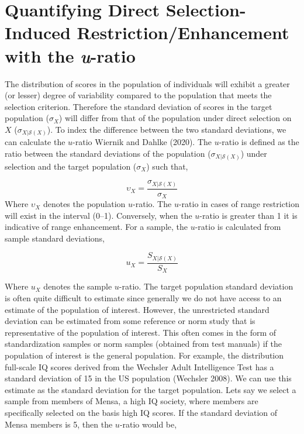 \documentclass[
  letterpaper,
  DIV=11,
  numbers=noendperiod]{scrreprt}
\begin{document}
\section{\texorpdfstring{Quantifying Direct Selection-Induced
Restriction/Enhancement with the
\emph{u}-ratio}{Quantifying Direct Selection-Induced Restriction/Enhancement with the u-ratio}}\label{quantifying-direct-selection-induced-restrictionenhancement-with-the-u-ratio}

The distribution of scores in the population of individuals will exhibit
a greater (or lesser) degree of variability compared to the population
that meets the selection criterion. Therefore the standard deviation of
scores in the target population (\(\sigma_{X}\)) will differ from that
of the population under direct selection on \(X\)
(\(\sigma_{X|\mathcal{S}(X)}\)). To index the difference between the two
standard deviations, we can calculate the \(u\)-ratio Wiernik and Dahlke
(2020). The \(u\)-ratio is defined as the ratio between the standard
deviations of the population (\(\sigma_{X|\mathcal{S}(X)}\)) under
selection and the target population (\(\sigma_{X}\)) such that,

\[
\upsilon_X = \frac{\sigma_{X|\mathcal{S}(X)}}{\sigma_{X}}
\] Where \(\upsilon_{X}\) denotes the population \(u\)-ratio. The
\(u\)-ratio in cases of range restriction will exist in the interval
(0--1). Conversely, when the \(u\)-ratio is greater than 1 it is
indicative of range enhancement. For a sample, the \(u\)-ratio is
calculated from sample standard deviations,

\[
u_X = \frac{S_{X|\mathcal{S}(X)}}{S_X}
\]

Where \(u_{X}\) denotes the sample \(u\)-ratio. The target population
standard deviation is often quite difficult to estimate since generally
we do not have access to an estimate of the population of interest.
However, the unrestricted standard deviation can be estimated from some
reference or norm study that is representative of the population of
interest. This often comes in the form of standardization samples or
norm samples (obtained from test manuals) if the population of interest
is the general population. For example, the distribution full-scale IQ
scores derived from the Wechsler Adult Intelligence Test has a standard
deviation of 15 in the US population (Wechsler 2008). We can use this
estimate as the standard deviation for the target population. Lets say
we select a sample from members of Mensa, a high IQ society, where
members are specifically selected on the basis high IQ scores. If the
standard deviation of Mensa members is 5, then the \(u\)-ratio would be,
\end{document}
